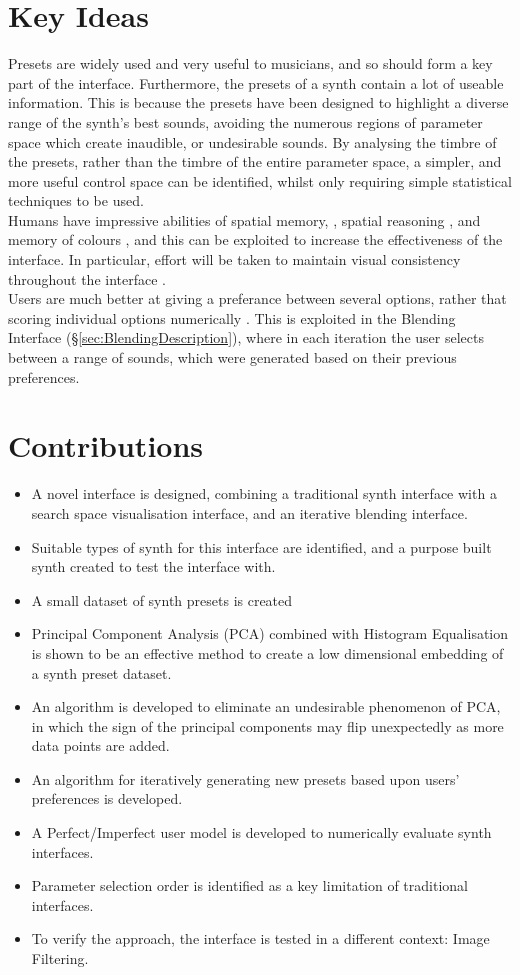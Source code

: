 \documentclass[11pt, oneside]{report}   	%
\begin{document}
\section{Key Ideas}
Presets are widely used and very useful to musicians, and so should form a key part of the interface. Furthermore, the presets of a synth contain a lot of useable information. This is because the presets have been designed to highlight a diverse range of the synth's best sounds, avoiding the numerous regions of parameter space which create inaudible, or undesirable sounds. By analysing the timbre of the presets, rather than the timbre of the entire parameter space, a simpler, and more useful control space can be identified, whilst only requiring simple statistical techniques to be used.\\
%
Humans have impressive abilities of spatial memory, \cite{SpatialMemory}, spatial reasoning \cite{SpatialCognition}, and memory of colours \cite{MemoryColour}, and this can be exploited to increase the effectiveness of the interface. In particular, effort will be taken to maintain visual consistency throughout the interface \cite{Consistency}.\\
%
Users are much better at giving a preferance between several options, rather that scoring individual options numerically \cite{RatingRanking, PreferenceGallery}. This is exploited in the Blending Interface (\S \ref{sec:BlendingDescription}), where in each iteration the user selects between a range of sounds, which were generated based on their previous preferences.
%
\section{Contributions}
\begin{itemize}
	\setlength\itemsep{-1.0em}
	\item A novel interface is designed, combining a traditional synth interface with a search space visualisation interface, and an iterative blending interface.
	\item Suitable types of synth for this interface are identified, and a purpose built synth created to test the interface with.
	\item A small dataset of synth presets is created
	\item Principal Component Analysis (PCA) combined with Histogram Equalisation is shown to be an effective method to create a low dimensional embedding of a synth preset dataset.
	\item An algorithm is developed to eliminate an undesirable phenomenon of PCA, in which the sign of the principal components may flip unexpectedly as more data points are added.
	\item An algorithm for iteratively generating new presets based upon users' preferences is developed.
	\item A Perfect/Imperfect user model is developed to numerically evaluate synth interfaces.
	\item Parameter selection order is identified as a key limitation of traditional interfaces.
	\item To verify the approach, the interface is tested in a different context: Image Filtering.
\end{itemize}
\end{document}
